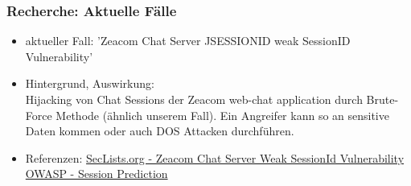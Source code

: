 \documentclass[12pt,a4paper,titlepage,oneside]{scrartcl}
\begin{document}
\subsubsection{Recherche: Aktuelle Fälle}
\noindent	
\begin{itemize}
\item aktueller Fall: 'Zeacom Chat Server JSESSIONID weak SessionID Vulnerability'
\item Hintergrund, Auswirkung: \\
Hijacking von Chat Sessions der Zeacom web-chat application durch Brute-Force Methode (ähnlich unserem Fall).  
Ein Angreifer kann so an sensitive Daten kommen oder auch DOS Attacken durchführen.
\item Referenzen: 
\subitem \href{http://seclists.org/bugtraq/2011/May/137}{SecLists.org - Zeacom Chat Server Weak SessionId Vulnerability}
\subitem \href{https://www.owasp.org/index.php/Session_Prediction}{OWASP - Session Prediction}
\end{itemize}
\end{document}

